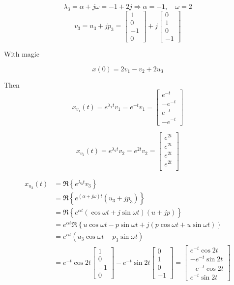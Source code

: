 \documentclass[12pt,a4paper]{article}
\begin{document}
\[
\lambda_3 = \alpha + j\omega = -1 + 2j \Rightarrow \alpha = -1, \quad\omega = 2
\]
\[
v_3 = u_3 + jp_3 = \begin{bmatrix}
	1 \\ 0 \\ -1 \\ 0
\end{bmatrix} + j \begin{bmatrix}
	0 \\ 1 \\ 0 \\ -1
\end{bmatrix}
\]

With magic 

\[
x(0) = 2v_1 - v_2  + 2u_3
\]

Then
\[
x_{v_1}(t) = e^{\lambda_1 t} v_1 = e^{-t} v_1 = \begin{bmatrix}
	e^{-t} \\ - e^{-t} \\ e^{-t} \\ -e^{-t}
\end{bmatrix}
\]

\[
x_{v_2}(t) = e^{\lambda_2 t} v_2 = e^{2t} v_2 = \begin{bmatrix}
	e^{2t} \\e^{2t} \\e^{2t} \\e^{2t} \\
\end{bmatrix}
\]

\begin{align*}
	x_{u_3}(t) &= \Re \left\{ e^{\lambda_3 t} v_3 \right\} \\
	&= \Re \left\{ e^{(\alpha + j\omega)t} (u_3 + jp_3)\right\} \\
	&= \Re \left\{ e^{\alpha t} (\cos \omega t + j\sin \omega t) (u + jp) \right\} \\
	&= e^{\alpha t} \Re \left\{ u\cos \omega t - p\sin \omega t + j(p\cos \omega t + u\sin \omega t) \right\} \\
	&=e^{\alpha t} (u_3\cos \omega t - p_3 \sin \omega t) \\
	&= e^{-t} \cos 2t \begin{bmatrix}
		1 \\ 0 \\ -1 \\ 0
	\end{bmatrix} - e^{-t} \sin 2t \begin{bmatrix}
	0 \\ 1 \\ 0 \\ -1
	\end{bmatrix} = \begin{bmatrix}
	e^{-t} \cos 2t \\
	-e^{-t} \sin 2t \\
	-e^{-t} \cos 2t \\
	e^{-t} \sin 2t
	\end{bmatrix}
\end{align*}
\end{document}

